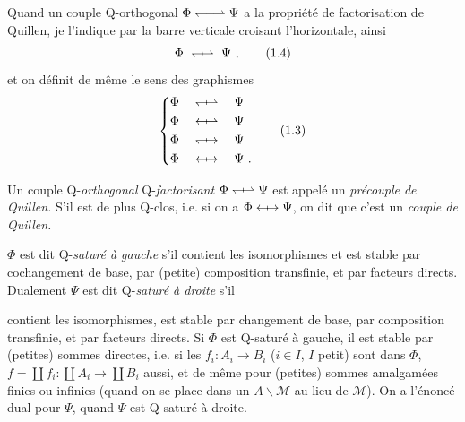 \documentclass[11pt]{article}
\newcommand{\printedpage}[1]{\marginpar{\footnotesize p.~#1}}
\newcommand{\msp}[1]{\marginpar{\footnotesize [#1]}}
\newcommand{\Qo}{\mathrel{\leftharpoondown\joinrel\relbar\joinrel\rightharpoonup}}   %
\newcommand{\Qx}[2]{\mathrel{#1\joinrel\mapstochar#2}}
\begin{document}
Quand un couple Q-orthogonal $\Phi \Qo \Psi$ a la propriété de factorisation de Quillen, je l'indique par la barre verticale croisant l'horizontale, ainsi
\[
\Phi \ \Qx{\leftharpoondown}{\rightharpoonup} \ \Psi\ ,
\tag*{(1.4)}
\]
et on définit de même le sens des graphismes
\[
\left\{
\begin{aligned}
&\Phi \quad \Qx{\leftharpoondown}{\rightharpoonup} \quad \Psi\\
&\Phi \quad \Qx{\leftarrow}{\rightharpoonup} \quad \Psi\\
&\Phi \quad \Qx{\leftharpoondown}{\rightarrow} \quad \Psi\\
&\Phi \quad \Qx{\leftarrow}{\rightarrow} \quad \Psi\ .
\end{aligned}
\right.
\tag*{(1.3)} %
\]

\newpage

\printedpage{2}

Un couple Q-\textit{orthogonal} Q-\textit{factorisant} $\Phi \Qx{\leftharpoondown}{\rightharpoonup} \Psi$ est appelé un \textit{précouple de Quillen.} S'il est de plus Q-clos, i.e. si on a $\Phi \Qx{\leftarrow}{\rightarrow} \Psi$, on dit que c'est un \textit{couple de Quillen.}

$\Phi$ est dit Q-\textit{saturé à gauche} s'il contient les isomorphismes et est stable par cochangement de base, par (petite) composition transfinie, et par facteurs directs. Dualement $\Psi$ est dit Q-\textit{saturé à droite} s'il

\msp{page 3}

contient les isomorphismes, est stable par changement de base, par composition transfinie, et par facteurs directs. Si $\Phi$ est Q-saturé à gauche, il est stable par (petites) sommes directes, i.e. si les $f_i : A_i \longrightarrow B_i$ ($i \in I$, $I$ petit) sont dans $\Phi$, $f = \coprod f_i : \coprod A_i \longrightarrow \coprod B_i$ aussi, et de même pour (petites) sommes amalgamées finies ou infinies (quand on se place dans un $A\backslash\mathcal{M}$ au lieu de $\mathcal{M}$). On a l'énoncé dual pour $\Psi$, quand $\Psi$ est Q-saturé à droite.
\end{document}
